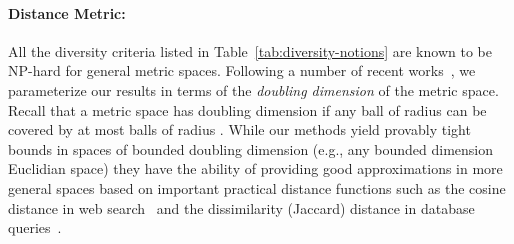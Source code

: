 \documentclass{article}
\begin{document}
\paragraph{Distance Metric:} All the diversity criteria listed in
Table~\ref{tab:diversity-notions} are known to be NP-hard for general
metric spaces. Following a number of recent
works~\cite{AckermannBS10,ColeL06,KonjevodRX08,GottliebKK14,CeccarelloPPU15,CeccarelloPPU16},
we parameterize our results in terms of the \emph{doubling dimension}
of the metric space. Recall that a metric space has doubling dimension
 if any ball of radius  can be covered by at most  balls of
radius . While our methods yield provably tight bounds in spaces
of bounded doubling dimension (e.g., any bounded dimension Euclidian space) they have the ability of providing good approximations
in more general spaces based on important practical distance functions
such as the cosine distance in web search~\cite{AngelK11} and the dissimilarity
(Jaccard) distance in database queries~\cite{LeskovecRU14}.
\end{document}
